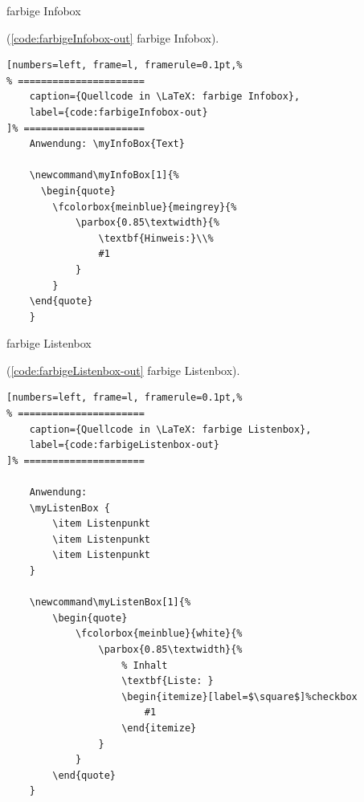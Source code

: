 farbige Infobox

(\autoref{code:farbigeInfobox-out} farbige Infobox).
\lstset{language=[LaTeX]TeX} %
\begin{lstlisting}[numbers=left, frame=l, framerule=0.1pt,%
% ======================
	caption={Quellcode in \LaTeX: farbige Infobox},
	label={code:farbigeInfobox-out}
]% =====================
	Anwendung: \myInfoBox{Text}

	\newcommand\myInfoBox[1]{%
	  \begin{quote}
		\fcolorbox{meinblue}{meingrey}{%
			\parbox{0.85\textwidth}{%
				\textbf{Hinweis:}\\%
				#1
			}
		}
	\end{quote}
	}
\end{lstlisting}




farbige Listenbox

(\autoref{code:farbigeListenbox-out} farbige Listenbox).
\lstset{language=[LaTeX]TeX} %
\begin{lstlisting}[numbers=left, frame=l, framerule=0.1pt,%
% ======================
	caption={Quellcode in \LaTeX: farbige Listenbox},
	label={code:farbigeListenbox-out}
]% =====================

	Anwendung:
	\myListenBox {
		\item Listenpunkt
		\item Listenpunkt
		\item Listenpunkt
	}

	\newcommand\myListenBox[1]{%
		\begin{quote}
			\fcolorbox{meinblue}{white}{%
				\parbox{0.85\textwidth}{%
					% Inhalt
					\textbf{Liste: }
					\begin{itemize}[label=$\square$]%checkbox
						#1
					\end{itemize}
				}
			}
		\end{quote}
	}
\end{lstlisting}

